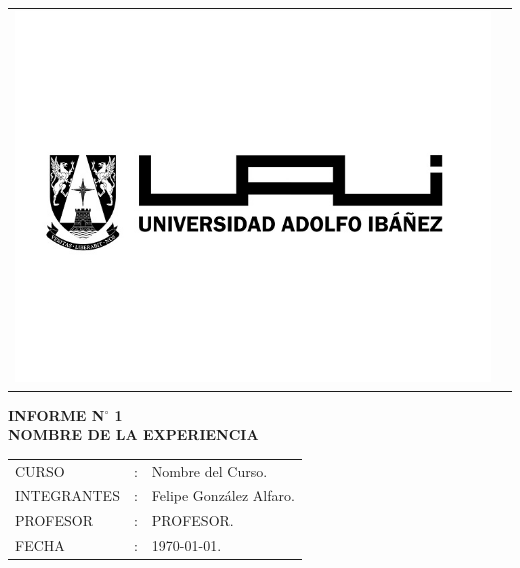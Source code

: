 \begin{titlepage}
    \begin{flushleft}
        \begin{tabular}{ll} %
          \multirow{4}{2cm}{\includegraphics[height=0.2\textheight]{img/logo-uai-b.jpg}}
        \end{tabular}
    \end{flushleft}
    
    \vspace*{\fill}%
    \begin{center}
    \textbf{INFORME N$\bm{^{\circ}}$ 1}\\ %
    \textbf{NOMBRE DE LA EXPERIENCIA} 
    \end{center}
    \vspace*{\fill}%
    
    \begin{flushright}
       \begin{tabular}{lll}
       CURSO       &:& Nombre del Curso.\\
       INTEGRANTES &:& Felipe González Alfaro.\\
       PROFESOR    &:& PROFESOR.\\
       FECHA       &:& \today.\\
       \end{tabular}
    \end{flushright}
    \end{titlepage}
    